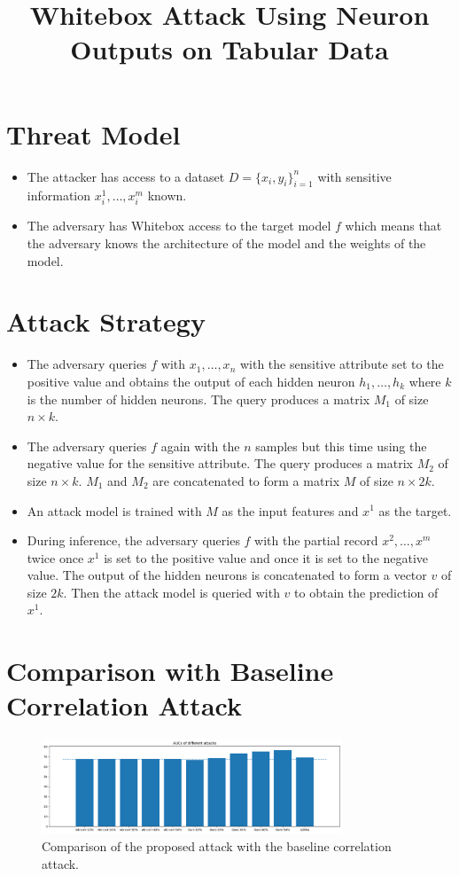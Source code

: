 \documentclass{article}
\begin{document}
\title{Whitebox Attack Using Neuron Outputs on Tabular Data}

\section{Threat Model}
\begin{itemize}
\item The attacker has access to a dataset $D=\{x_i,y_i\}_{i=1}^n$ with sensitive information $x_i^1,\ldots,x_i^m$ known.
\item The adversary has Whitebox access to the target model $f$ which means that the adversary knows the architecture of the model and the weights of the model. 
\end{itemize}

\section{Attack Strategy}
\begin{itemize}
    \item The adversary queries $f$ with $x_1, \ldots, x_n$ with the sensitive attribute set to the positive value and obtains the output of each hidden neuron $h_1, \ldots, h_k$ where $k$ is the number of hidden neurons. The query produces a matrix $M_1$ of size $n \times k$.
    \item The adversary queries $f$ again with the $n$ samples but this time using the negative value for the sensitive attribute. The query produces a matrix $M_2$ of size $n \times k$. $M_1$ and $M_2$ are concatenated to form a matrix $M$ of size $n \times 2k$.
    \item An attack model is trained with $M$ as the input features and $x^1$ as the target.
    \item During inference, the adversary queries $f$ with the partial record $x^2, \ldots, x^m$ twice once $x^1$ is set to the positive value and once it is set to the negative value. The output of the hidden neurons is concatenated to form a vector $v$ of size $2k$. Then the attack model is queried with $v$ to obtain the prediction of $x^1$.
\end{itemize}

\section{Comparison with Baseline Correlation Attack}
\begin{figure}[h]
    \centering
    \includegraphics[width=0.8\textwidth]{plots/wb_comparison_w_baseline.png}
    \caption{Comparison of the proposed attack with the baseline correlation attack.}
    \label{fig:wb_comparison_w_baseline}
\end{figure}
\end{document}
